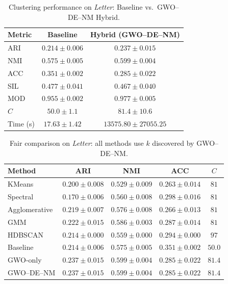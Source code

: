 \begin{table}[htbp]
\centering
\caption{Clustering performance on \textit{Letter}: Baseline vs.\ GWO--DE--NM Hybrid.}
\label{tab:letter}
\begin{tabular}{lcc}
\toprule
Metric & Baseline & Hybrid (GWO--DE--NM) \\
\midrule
ARI & $0.214 \pm 0.006$ & $\mathbf{0.237 \pm 0.015}$ \\
NMI & $0.575 \pm 0.005$ & $\mathbf{0.599 \pm 0.004}$ \\
ACC & $\mathbf{0.351 \pm 0.002}$ & $0.285 \pm 0.022$ \\
SIL & $\mathbf{0.477 \pm 0.041}$ & $0.467 \pm 0.040$ \\
MOD & $0.955 \pm 0.002$ & $\mathbf{0.977 \pm 0.005}$ \\
\midrule
$C$ & $50.0 \pm 1.1$ & $81.4 \pm 10.6$ \\
Time (s) & $17.63 \pm 1.42$ & $13575.80 \pm 27055.25$ \\
\bottomrule
\end{tabular}
\end{table}

\begin{table}[htbp]
\centering\small
\caption{Fair comparison on \textit{Letter}: all methods use $k$ discovered by GWO--DE--NM.}
\label{tab:fair_letter}
\begin{tabular}{lcccc}
\toprule
Method & ARI & NMI & ACC & $C$ \\
\midrule
KMeans & $0.200 \pm 0.008$ & $0.529 \pm 0.009$ & $0.263 \pm 0.014$ & $81$ \\
Spectral & $0.170 \pm 0.006$ & $0.560 \pm 0.008$ & $0.298 \pm 0.016$ & $81$ \\
Agglomerative & $0.219 \pm 0.007$ & $0.576 \pm 0.008$ & $0.266 \pm 0.013$ & $81$ \\
GMM & $0.222 \pm 0.015$ & $0.586 \pm 0.003$ & $0.287 \pm 0.014$ & $81$ \\
HDBSCAN & $0.214 \pm 0.000$ & $0.559 \pm 0.000$ & $0.294 \pm 0.000$ & $97$ \\
\midrule
Baseline & $0.214 \pm 0.006$ & $0.575 \pm 0.005$ & $0.351 \pm 0.002$ & $50.0$ \\
GWO-only & $\mathbf{0.237 \pm 0.015}$ & $0.599 \pm 0.004$ & $0.285 \pm 0.022$ & $81.4$ \\
GWO--DE--NM & $0.237 \pm 0.015$ & $0.599 \pm 0.004$ & $0.285 \pm 0.022$ & $81.4$ \\
\bottomrule
\end{tabular}
\end{table}


